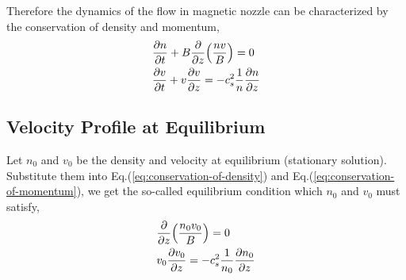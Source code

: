 Therefore the dynamics of the flow in magnetic nozzle can be characterized by the conservation of density and momentum,
\begin{align} 
	&\pdv{n}{t} + B\pdv{z}(\frac{nv}{B}) = 0\label{eq:conservation-of-density}\\ 
  &\pdv{v}{t} + v\pdv{v}{z} = -c_s^2\frac{1}{n}\pdv{n}{z} \label{eq:conservation-of-momentum}
\end{align}

\subsection{Velocity Profile at Equilibrium}
Let $n_0$ and $v_0$ be the density and velocity at equilibrium (stationary solution). Substitute them into Eq.(\ref{eq:conservation-of-density}) and Eq.(\ref{eq:conservation-of-momentum}), we get the so-called equilibrium condition which $n_0$ and $v_0$ must satisfy,
\begin{align*}
	&\pdv{z}(\frac{n_0v_0}{B}) = 0 \\
	&v_0\pdv{v_0}{z} = -c_s^2\frac{1}{n_0}\pdv{n_0}{z} 
\end{align*}

